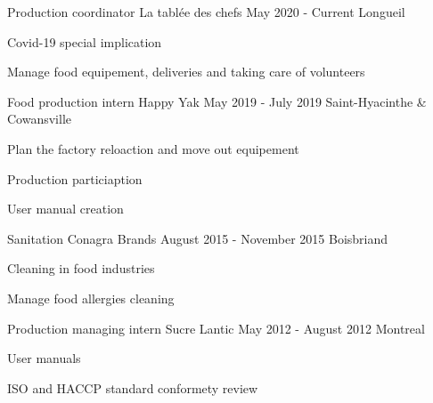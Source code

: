 

\begin{cventries}

  \cventry
    {Production coordinator} %
    {La tablée des chefs} %
    {May 2020 - Current} %
    {Longueil} %
    {
      \begin{cvitems} %
        \item {Covid-19 special implication}
        \item {Manage food equipement, deliveries and taking care of volunteers}
      \end{cvitems}
    }

  \cventry
    {Food production intern} %
    {Happy Yak} %
    {May 2019 - July 2019} %
    {Saint-Hyacinthe \& Cowansville} %
    {
      \begin{cvitems} %
        \item {Plan the factory reloaction and move out equipement}
        \item {Production particiaption}
        \item {User manual creation}
      \end{cvitems}
    }

  \cventry
    {Sanitation} %
    {Conagra Brands} %
    {August 2015 - November 2015} %
    {Boisbriand} %
    {
      \begin{cvitems} %
        \item {Cleaning in food industries}
        \item {Manage food allergies cleaning}
      \end{cvitems}
    }

  \cventry
    {Production managing intern} %
    {Sucre Lantic} %
    {May 2012 - August 2012} %
    {Montreal} %
    {
      \begin{cvitems} %
        \item {User manuals}
        \item {ISO and HACCP standard conformety review}
      \end{cvitems}
    }


\end{cventries}
